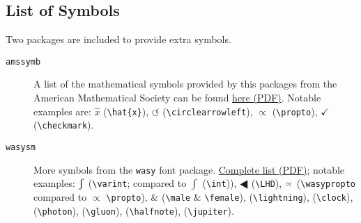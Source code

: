 \subsection{List of Symbols} %
\label{sub:list_of_symbols}
Two packages are included to provide extra symbols.
\begin{description}
	\item[\texttt{amssymb}] A list of the mathematical symbols provided by this packages from the American Mathematical Society can be found \href{http://milde.users.sourceforge.net/LUCR/Math/mathpackages/amssymb-symbols.pdf}{here (PDF)}. Notable examples are: $\hat{x}$ (\verb|\hat{x}|), $\circlearrowleft$ (\verb|\circlearrowleft|), $\propto$ (\verb|\propto|), $\checkmark$ (\verb|\checkmark|).
	\item[\texttt{wasysm}] More symbols from the \texttt{wasy} font package. \href{http://ftp.gwdg.de/pub/ctan/macros/latex/contrib/wasysym/wasysym.pdf}{Complete list (PDF)}; notable examples: $\varint$ (\verb|\varint|; compared to $\int$ (\verb|\int|)), $\LHD$ (\verb|\LHD|), $\wasypropto$ (\verb|\wasypropto| compared to $\propto$ \verb|\propto|), {\male} \& {\female} (\verb|\male| \& \verb|\female|), {\lightning} (\verb|\lightning|), {\clock} (\verb|\clock|), {\photon} (\verb|\photon|), {\gluon} (\verb|\gluon|), {\halfnote} (\verb|\halfnote|), {\jupiter} (\verb|\jupiter|).
\end{description}


